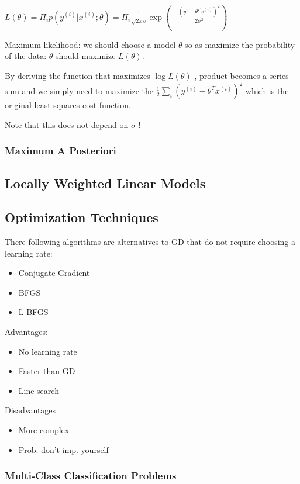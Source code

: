 $L(\theta)= \Pi_{i} p(y^{(i)}| x^{(i)};\theta) = \Pi_{i} \frac{1}{\sqrt{2\pi}\sigma}\exp\left(-\frac{(y^{i}- \theta^Tx^{(i)})^2}{2\sigma^2}\right) $

Maximum likelihood: we should choose a model $\theta$ so as maximize the probability of the data: $\theta$ should maximize $L(\theta)$. 

By deriving the function that maximizes $\log L(\theta)$ , product becomes a series sum and we simply need to maximize the $\frac 1 2 \sum_i (y^{(i)}-\theta^T x^{(i)})^2$ which is the original least-squares cost function.

Note that this does not depend on $\sigma$ !

\subsubsection{Maximum A Posteriori}


\subsection{Locally Weighted Linear Models}

\subsection{Optimization Techniques}

There following algorithms are alternatives to GD that do not require choosing a learning rate:

\begin{itemize}
\item Conjugate Gradient
\item BFGS
\item L-BFGS
\end{itemize}

Advantages:
\begin{itemize}
\item No learning rate
\item Faster than GD
\item Line search
\end{itemize}

Disadvantages
\begin{itemize}
\item More complex
\item Prob. don't imp. yourself
\end{itemize}

\subsubsection{Multi-Class Classification Problems}

